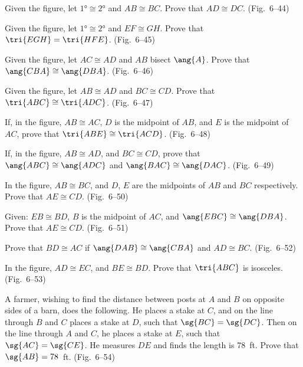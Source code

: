 \documentclass[11pt]{book}
\theoremstyle{bkplain}
\theoremstyle{XIplainnote}
\theoremstyle{bkplain}
\theoremstyle{bkplain}
\begin{document}
\begin{exercisecols}
\begin{exlist}
\item Given the figure, let $\ang{1} \cong \ang{2}$ and $AB \cong BC$. Prove
  that $AD \cong DC$. (Fig.~6--44)
\exfig{\FIGVIFORTYFOUR}
\item Given the figure, let $\ang{1} \cong \ang{2}$ and $EF \cong GH$. Prove
  that $\tri{EGH} = \tri{HFE}$. (Fig.~6--45)
\exfig{\FIGVIFORTYFIVE}
\item Given the figure, let $AC \cong AD$ and $AB$ bisect $\ang{A}$. Prove that
  $\ang{CBA} \cong \ang{DBA}$. (Fig.~6--46)
\exfig{\FIGVIFORTYSIX}
\item Given the figure, let $AB \cong AD$ and $BC \cong CD$. Prove that
  $\tri{ABC} \cong \tri{ADC}$. (Fig.~6--47)
\exfig{\FIGVIFORTYSEVEN}
\item If, in the figure, $AB \cong AC$, $D$ is the midpoint of $AB$, and $E$ is
  the midpoint of $AC$, prove that $\tri{ABE} \cong \tri{ACD}$. (Fig.~6--48)
\exfig{\FIGVIFORTYEIGHT}
\item If, in the figure, $AB \cong AD$, and $BC \cong CD$, prove that
  $\ang{ABC} \cong \ang{ADC}$ and $\ang{BAC} \cong \ang{DAC}$. (Fig.~6--49)
\exfig{\FIGVIFORTYNINE}
\item In the figure, $AB \cong BC$, and $D$, $E$ are the midpoints of $AB$ and
  $BC$ respectively. Prove that $AE \cong CD$. (Fig.~6--50)
\exfig{\FIGVIFIFTY}
\item Given: $EB \cong BD$, $B$ is the midpoint of $AC$, and $\ang{EBC} \cong
  \ang{DBA}$. Prove that $AE \cong CD$. (Fig.~6--51)
\exfig{\FIGVIFIFTYONE}
\item Prove that $BD \cong AC$ if $\ang{DAB} \cong \ang{CBA}$ and $AD \cong
  BC$. (Fig.~6--52)
\exfig{\FIGVIFIFTYTWO}
\item In the figure, $AD \cong EC$, and $BE \cong BD$. Prove that $\tri{ABC}$
  is isosceles. (Fig.~6--53)
\exfig{\FIGVIFIFTYTHREE}
\item A farmer, wishing to find the distance between posts at $A$ and $B$ on
  opposite sides of a barn, does the following. He places a stake at $C$, and
  on the line through $B$ and $C$ places a stake at $D$, such that $\sg{BC} =
  \sg{DC}$. Then on the line through $A$ and $C$, he places a stake at $E$,
  such that $\sg{AC} = \sg{CE}$. He measures $DE$ and finds the length is
  78~ft. Prove that $\sg{AB} = 78$~ft. (Fig.~6--54)
\exfig{\FIGVIFIFTYFOUR}
\end{exlist}
\end{exercisecols}
\end{document}
